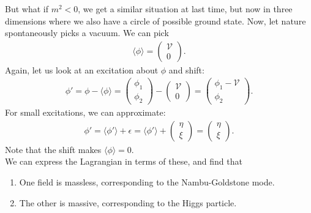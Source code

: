 \documentclass[a4paper,11pt]{article}
\numberwithin{equation}{section}
\theoremstyle{definition}
\begin{document}
But what if $m^2 < 0$, we get a similar situation at last time, but now in three dimensions where we also have a circle of possible ground state. Now, let nature spontaneously picks a vacuum. We can pick
\begin{align}
\langle \phi \rangle = \begin{pmatrix}
\mathcal{V}\\0
\end{pmatrix}.
\end{align}
Again, let us look at an excitation about $\phi$ and shift:
\begin{align}
\phi' = \phi - \langle \phi \rangle = \begin{pmatrix}
\phi_1\\\phi_2
\end{pmatrix} - \begin{pmatrix}
\mathcal{V}\\0
\end{pmatrix} = 
\begin{pmatrix}
\phi_1 - \mathcal{V}\\\phi_2
\end{pmatrix}.
\end{align}
For small excitations, we can approximate:
\begin{align}
\phi' = \langle \phi'\rangle + \epsilon = \langle \phi' \rangle + \begin{pmatrix}
\eta \\ \xi
\end{pmatrix}=
\begin{pmatrix}
\eta \\ \xi
\end{pmatrix}.
\end{align}
Note that the shift makes $\langle \phi \rangle = 0$.\\

We can express the Lagrangian in terms of these, and find that 
\begin{enumerate}
	\item One field is massless, corresponding to the Nambu-Goldstone mode.
	\item The other is massive, corresponding to the Higgs particle. 
\end{enumerate}
\end{document}
